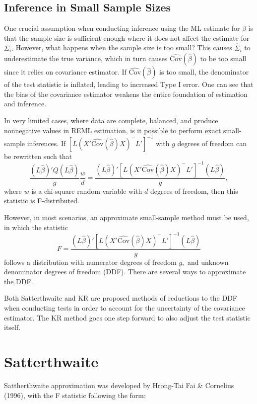 \documentclass[12pt, twoside]{amherstthesis}
\begin{document}
\hypertarget{inference-in-small-sample-sizes}{%
\subsection{Inference in Small Sample Sizes}\label{inference-in-small-sample-sizes}}

One crucial assumption when conducting inference using the ML estimate for \(\beta\) is that the sample size is sufficient enough where it does not affect the estimate for \(\Sigma_i.\) However, what happens when the sample size is too small? This causes \(\hat\Sigma_i\) to underestimate the true variance, which in turn causes \(\widehat {\text{Cov}}(\hat\beta)\) to be too small since it relies on covariance estimator. If \(\widehat {\text{Cov}}(\hat\beta)\) is too small, the denominator of the test statistic is inflated, leading to increased Type I error. One can see that the bias of the covariance estimator weakens the entire foundation of estimation and inference.

In very limited cases, where data are complete, balanced, and produce nonnegative values in REML estimation, is it possible to perform exact small-sample inferences. If \([L(X'\widehat {\text{Cov}}(\hat\beta)X)^-L']^{-1}\) with \(g\) degrees of freedom can be rewritten such that \[ \frac{(L\hat\beta)'Q(L\hat\beta)}{g}\frac{w}{d} =  \frac{(L\hat\beta)'[L(X'\widehat {\text{Cov}}(\hat\beta)X)^-L']^{-1}(L\hat\beta)}{g},\] where \(w\) is a chi-square random variable with \(d\) degrees of freedom, then this statistic is F-distributed.

However, in most scenarios, an approximate small-sample method must be used, in which the statistic \[F = \frac{(L\hat\beta)'[L(X'\widehat {\text{Cov}}(\hat\beta)X)^-L']^{-1}(L\hat\beta)}{g}\] follows a distribution with numerator degrees of freedom \(g,\) and unknown denominator degrees of freedom (DDF). There are several ways to approximate the DDF.

Both Satterthwaite and KR are proposed methods of reductions to the DDF when conducting tests in order to account for the uncertainty of the covariance estimator. The KR method goes one step forward to also adjust the test statistic itself.

\hypertarget{satterthwaite}{%
\section{Satterthwaite}\label{satterthwaite}}

Sattherthwaite approximation was developed by Hrong-Tai Fai \& Cornelius (1996), with the F statistic following the form:
\end{document}
